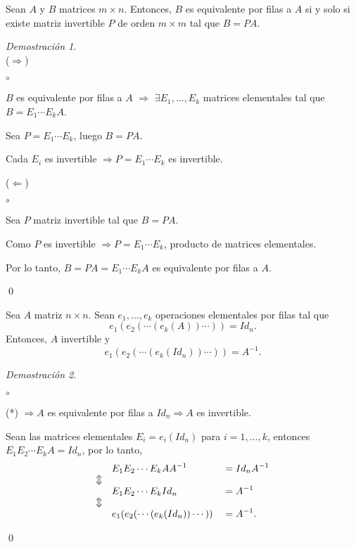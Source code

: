 \documentclass{article}
\theoremstyle{definition}
\theoremstyle{definition}
\theoremstyle{remark}
\newtheorem*{demo}{Demostración}
\begin{document}
\begin{corol}
  Sean $A$ y $B$ matrices $m \times n$. Entonces, $B$ es equivalente por filas a $A$ si y solo si existe matriz invertible $P$ de orden $ m \times m$ tal que $B=PA$.
\end{corol}
\begin{demo}
  \;\\($\Rightarrow$) \begin{list}{$\circ$}{}  
\item  $B$ es equivalente por filas a $A$ $\Rightarrow$ $\exists E_1, \dots, E_k$ matrices elementales tal que $B=E_1 \cdots E_k A$. 
\item Sea $P=E_1 \cdots E_k$, luego $B=PA$. 
\item Cada $E_i$ es invertible $\Rightarrow P=E_1 \cdots E_k$ es invertible. 
\end{list}
($\Leftarrow$)\begin{list}{$\circ$}{}  
\item Sea $P$ matriz invertible tal que $B=PA$. 
\item Como $P$ es invertible $\Rightarrow P=E_1 \cdots E_k$, producto de matrices elementales. 
\item Por lo tanto, $B=PA=E_1\cdots E_kA$ es equivalente por filas a $A$. 
\end{list}\qed
\end{demo}
\begin{corol}
  Sea $A$ matriz $n \times n$. Sean $e_1, \dots, e_k$ operaciones elementales por filas tal que \begin{equation}\tag{*}
    e_1(e_2(\cdots(e_k(A))\cdots))=Id_n.
  \end{equation}
  Entonces, $A$ invertible y \begin{equation}\tag{**}
    e_1(e_2(\cdots(e_k(Id_n))\cdots))=A^{-1}.
  \end{equation}
\end{corol}\begin{demo}\;
  \begin{list}{$\circ$}{}  
\item  (*) $\Rightarrow A$ es equivalente por filas a $Id_n \Rightarrow A$ es invertible.
\item Sean las matrices elementales $E_i=e_i(Id_n)$ para $i=1,\dots,k$, entonces $E_1E_2 \cdots E_kA=Id_n$, por lo tanto, \[
    \begin{aligned}
&E_1E_2 \cdots E_k  AA^{-1} &&=Id_nA^{-1} \\
\ArrowBetweenLines
&E_1E_2 \cdots E_k  Id_n &&= A^{-1} \\
\ArrowBetweenLines 
&e_1(e_2(\cdots(e_k(Id_n))\cdots)) &&=A^{-1}.
    \end{aligned}
  \]\end{list}
  \qed
\end{demo}
\pagebreak
\end{document}
